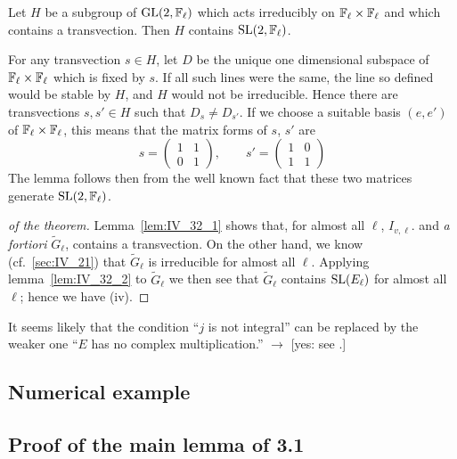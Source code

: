 \begin{lem}\label{lem:IV_32_2}
	Let $H$ be a subgroup of $\operatorname{GL}(2, \mathbb{F}_\ell)$ which acts irreducibly on
	$\mathbb{F}_\ell\times\mathbb{F}_\ell$ and which contains a transvection. Then $H$
	contains $\operatorname{SL}(2, \mathbb{F}_\ell)$.
\end{lem}

For any transvection $s \in H$, let $D$ be the unique one dimensional subspace
of $\mathbb{F}_\ell\times\mathbb{F}_\ell$ which is fixed by $s$. If all such lines were the
same, the line so defined would be stable by $H$, and $H$ would not be
irreducible. Hence there are transvections $s, s' \in H$ such that $D_s \ne
D_{s'}$. If we choose a suitable basis $(e,e')$ of $\mathbb{F}_\ell\times\mathbb{F}_\ell$, this
means that the matrix forms of $s$, $s'$ are
\[
	s =
	\begin{pmatrix}
		1 & 1 \\
		0 & 1
	\end{pmatrix}, \qquad s' = 
	\begin{pmatrix}
		1 & 0 \\
		1 & 1
	\end{pmatrix} 
\]
The lemma follows then from the well known fact that these two matrices
generate $\operatorname{SL}(2, \mathbb{F}_\ell)$.

\begin{proof}[ of the theorem]
	Lemma~\ref{lem:IV_32_1} shows that, for almost all $\ell$, $I_{v,
	\ell}$.  and \emph{a fortiori} $\widetilde{G}_\ell$, contains a
	transvection. On the other hand, we know (cf.\ \ref{sec:IV_21}) that
	$\widetilde{G}_\ell$ is irreducible for almost all $\ell$. Applying
	lemma~\ref{lem:IV_32_2} to $\widetilde{G}_\ell$ we then see that
	$\widetilde{G}_\ell$ contains $\operatorname{SL}({E}_{\ell})$ for almost all
	$\ell$; hence we have (iv).
\end{proof}

\begin{obs}
	It seems likely that the condition ``$j$ is not integral'' can be
	replaced by the weaker one ``$E$ has no complex multiplication.''
	$\to$ [yes: see \cite{76}.]
\end{obs}

\subsection{Numerical example}
\label{sec:IV_33}

\subsection{Proof of the main lemma of 3.1}
\label{sec:IV_34}

